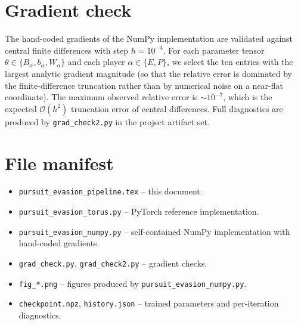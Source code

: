 \documentclass[11pt]{article}
\begin{document}
\appendix
\section{Gradient check}
\label{app:gradcheck}
The hand-coded gradients of the NumPy implementation are validated
against central finite differences with step $h=10^{-4}$.  For each
parameter tensor $\theta\in\{B_\alpha,b_\alpha,W_\alpha\}$ and each
player $\alpha\in\{E,P\}$, we select the ten entries with the largest
analytic gradient magnitude (so that the relative error is dominated by
the finite-difference truncation rather than by numerical noise on a
near-flat coordinate).  The maximum observed relative error is
$\sim 10^{-7}$, which is the expected $\mathcal{O}(h^2)$ truncation
error of central differences.  Full diagnostics are produced by
\texttt{grad\_check2.py} in the project artifact set.

\section{File manifest}
\begin{itemize}
\item \texttt{pursuit\_evasion\_pipeline.tex} -- this document.
\item \texttt{pursuit\_evasion\_torus.py} -- PyTorch reference
      implementation.
\item \texttt{pursuit\_evasion\_numpy.py} -- self-contained NumPy
      implementation with hand-coded gradients.
\item \texttt{grad\_check.py}, \texttt{grad\_check2.py} -- gradient
      checks.
\item \texttt{fig\_*.png} -- figures produced by
      \texttt{pursuit\_evasion\_numpy.py}.
\item \texttt{checkpoint.npz}, \texttt{history.json} -- trained
      parameters and per-iteration diagnostics.
\end{itemize}
\end{document}
